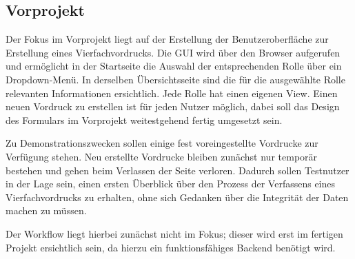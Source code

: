 \subsection{Vorprojekt}

    Der Fokus im Vorprojekt liegt auf der Erstellung der Benutzeroberfläche zur Erstellung eines Vierfachvordrucks. 
    Die GUI wird über den Browser aufgerufen und ermöglicht in der Startseite die Auswahl der entsprechenden Rolle über 
    ein Dropdown-Menü. In derselben Übersichtsseite sind die für die ausgewählte Rolle relevanten Informationen ersichtlich. 
    Jede Rolle hat einen eigenen View. Einen neuen Vordruck zu erstellen ist für jeden Nutzer möglich, dabei soll das 
    Design des Formulars im Vorprojekt weitestgehend fertig umgesetzt sein.
    
    Zu Demonstrationszwecken sollen einige fest voreingestellte Vordrucke zur Verfügung stehen. Neu erstellte Vordrucke
    bleiben zunächst nur temporär bestehen und gehen beim Verlassen der Seite verloren. Dadurch sollen Testnutzer
    in der Lage sein, einen ersten Überblick über den Prozess der Verfassens eines Vierfachvordrucks zu erhalten,
    ohne sich Gedanken über die Integrität der Daten machen zu müssen.

    Der Workflow liegt hierbei zunächst nicht im Fokus; dieser wird erst im fertigen Projekt ersichtlich sein, da hierzu
    ein funktionsfähiges Backend benötigt wird.
